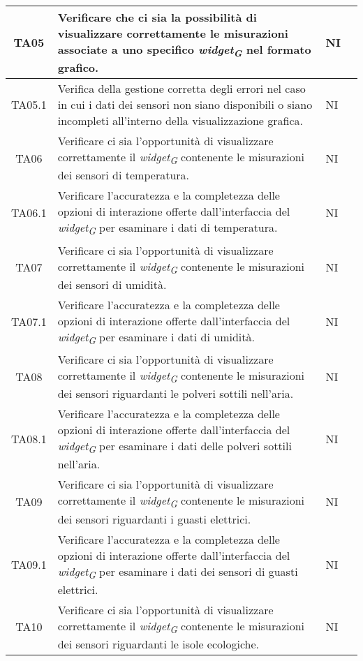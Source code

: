 \begin{longtable}{|c|p{5cm}|p{2cm}|c|}
    \hline
    TA05 & Verificare che ci sia la possibilità di visualizzare correttamente le misurazioni associate a uno specifico \textit{widget}\textsubscript{\textit{G}} nel formato grafico. & NI \\
    \hline
    TA05.1 & Verifica della gestione corretta degli errori nel caso in cui i dati dei sensori non siano disponibili o siano incompleti all'interno della visualizzazione grafica. & NI \\
    \hline
    TA06 & Verificare ci sia l'opportunità di visualizzare correttamente il \textit{widget}\textsubscript{\textit{G}} contenente le misurazioni dei sensori di temperatura. & NI \\
    \hline
    TA06.1 & Verificare l'accuratezza e la completezza delle opzioni di interazione offerte dall'interfaccia del \textit{widget}\textsubscript{\textit{G}} per esaminare i dati di temperatura. & NI \\
    \hline
    TA07 & Verificare ci sia l'opportunità di visualizzare correttamente il \textit{widget}\textsubscript{\textit{G}} contenente le misurazioni dei sensori di umidità. & NI \\
    \hline
    TA07.1 & Verificare l'accuratezza e la completezza delle opzioni di interazione offerte dall'interfaccia del \textit{widget}\textsubscript{\textit{G}} per esaminare i dati di umidità. & NI \\
    \hline
    TA08 & Verificare ci sia l'opportunità di visualizzare correttamente il \textit{widget}\textsubscript{\textit{G}} contenente le misurazioni dei sensori riguardanti le polveri sottili nell'aria. & NI \\
    \hline
    TA08.1 & Verificare l'accuratezza e la completezza delle opzioni di interazione offerte dall'interfaccia del \textit{widget}\textsubscript{\textit{G}} per esaminare i dati delle polveri sottili nell'aria. & NI \\
    \hline
    TA09 & Verificare ci sia l'opportunità di visualizzare correttamente il \textit{widget}\textsubscript{\textit{G}} contenente le misurazioni dei sensori riguardanti i guasti elettrici. & NI \\
    \hline
    TA09.1 & Verificare l'accuratezza e la completezza delle opzioni di interazione offerte dall'interfaccia del \textit{widget}\textsubscript{\textit{G}} per esaminare i dati dei sensori di guasti elettrici. & NI \\
    \hline
    TA10 & Verificare ci sia l'opportunità di visualizzare correttamente il \textit{widget}\textsubscript{\textit{G}} contenente le misurazioni dei sensori riguardanti le isole ecologiche. & NI \\

\end{longtable}
